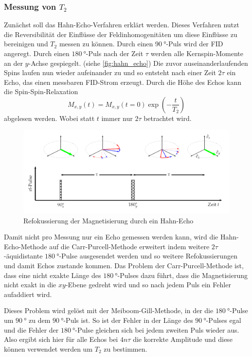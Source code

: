 \subsubsection{Messung von \texorpdfstring{$T_2$}{T2}}
\label{sssec:T2_Messung}

Zunächst soll das Hahn-Echo-Verfahren erklärt werden.
Dieses Verfahren nutzt die Reversibilität der Einflüsse der Feldinhomogenitäten um diese Einflüsse zu bereinigen und $T_2$ messen zu können.
Durch einen $\SI{90}{\degree}$-Puls wird der FID angeregt.
Durch einen $\SI{180}{\degree}$-Puls nach der Zeit $\tau$ werden alle Kernspin-Momente an der $y$-Achse gespiegelt. (siehe \autoref{fig:hahn_echo})
Die zuvor auseinanderlaufenden Spins laufen nun wieder aufeinander zu und so entsteht nach einer Zeit $2\tau$ ein Echo, das einen messbaren FID-Strom erzeugt.
Durch die Höhe des Echos kann die Spin-Spin-Relaxation 
\begin{equation}
    M_{x,y}(t) = M_{x,y}(t=0) \exp\left(-\frac{t}{T_2}\right)
    \label{eq:T2_relaxation}
\end{equation}
abgelesen werden. Wobei statt $t$ immer nur $2\tau$ betrachtet wird.

\begin{figure}
    \centering
    \includegraphics[width=\textwidth]{images/hahn_echo_2.png}
    \caption{Refokussierung der Magnetisierung durch ein Hahn-Echo \cite{V49}}
    \label{fig:hahn_echo}
\end{figure}

Damit nicht pro Messung nur ein Echo gemessen werden kann, wird die Hahn-Echo-Methode auf die Carr-Purcell-Methode erweitert
indem weitere $2\tau$-äquidistante $\SI{180}{\degree}$-Pulse ausgesendet werden 
und so weitere Refokussierungen und damit Echos zustande kommen.
Das Problem der Carr-Purcell-Methode ist, dass eine nicht exakte Länge des $\SI{180}{\degree}$-Pulses
dazu führt, dass die Magnetisierung nicht exakt in die $xy$-Ebene gedreht wird und so nach jedem Puls ein Fehler aufaddiert wird.

Dieses Problem wird gelöst mit der Meiboom-Gill-Methode, in der die $\SI{180}{\degree}$-Pulse um $\SI{90}{\degree}$ zu dem $\SI{90}{\degree}$-Puls ist.
So ist der Fehler in der Länge des $\SI{90}{\degree}$-Pulses egal und die Fehler der $\SI{180}{\degree}$-Pulse gleichen sich bei jedem zweiten Puls wieder aus.
Also ergibt sich hier für alle Echos bei $4n\tau$ die korrekte Amplitude und diese können verwendet werden um $T_2$ zu bestimmen.

